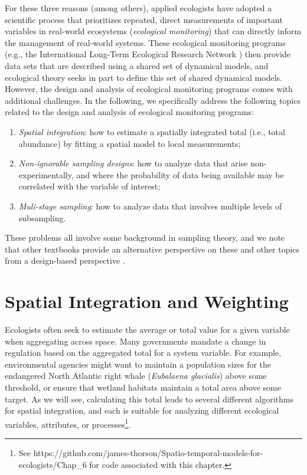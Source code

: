 For these three reasons (among others), applied ecologists have adopted a scientific process that prioritizes repeated, direct measurements of important variables in real-world ecosystems (\textit{ecological monitoring}) that can directly inform the management of real-world systems.  These ecological monitoring programs (e.g., the International Long-Term Ecological Research Network \cite{vanderbilt_international_2017}) then provide data sets that are described using a shared set of dynamical models, and ecological theory seeks in part to define this set of shared dynamical models.  However, the design and analysis of ecological monitoring programs comes with additional challenges.  In the following, we specifically address the following topics related to the design and analysis of ecological monitoring programs:

\begin{enumerate}
    \item \textit{Spatial integration}:  how to estimate a spatially integrated total (i.e., total abundance) by fitting a spatial model to local measurements;

    \item \textit{Non-ignorable sampling designs}:  how to analyze data that arise non-experimentally, and where the probability of data being available may be correlated with the variable of interest;

    \item \textit{Muli-stage sampling}:  how to analyze data that involves multiple levels of subsampling.
\end{enumerate}
These problems all involve some background in sampling theory, and we note that other textbooks provide an alternative perspective on these and other topics from a design-based perspective \cite{cochran_sampling_1977}.  

\section{Spatial Integration and Weighting} \label{sec:Chap6_spatial_integration}

Ecologists often seek to estimate the average or total value for a given variable when aggregating across space.  Many governments mandate a change in regulation based on the aggregated total for a system variable.  For example, environmental agencies might want to maintain a population sizes for the endangered North Atlantic right whale (\textit{Eubalaena glacialis}) above some threshold, or ensure that wetland habitats maintain a total area above some target.  As we will see, calculating this total leads to several different algorithms for spatial integration, and each is suitable for analyzing different ecological variables, attributes, or processes\footnote{See https://github.com/james-thorson/Spatio-temporal-models-for-ecologists/Chap\_6 for code associated with this chapter.}.  

